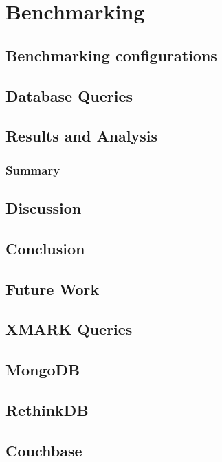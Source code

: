 \documentclass[a4paper,12pt]{book}
\begin{document}
	\chapter{Benchmarking}\label{ch:benchmarking} %
	\section{Benchmarking configurations}
	
    \section{Database Queries}
        
    \section{Results and Analysis}
        
   \subsection{Summary}
	\section{Discussion}
	\section{Conclusion}\label{conc}
	\section{Future Work}\label{s.future}
	\begin{appendices}
	   	\chapter{XMARK Queries}\label{appendices-queries}
		\section{MongoDB}\label{mongodb-query-list}
			
		\section{RethinkDB}\label{rethinkdb-query-list}
				
		\section{Couchbase}\label{couchbase-query-list}
				
								
	\end{appendices}
\end{document}
